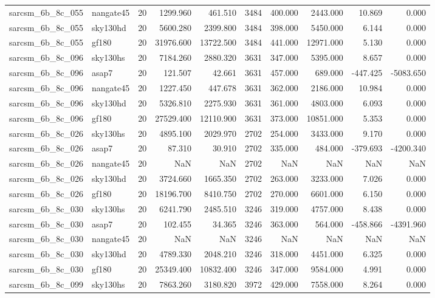 \begin{tabular}{llrrrrrrrr}
sarcsm\_6b\_8c\_055 & nangate45 & 20 & 1299.960 & 461.510 & 3484 & 400.000 & 2443.000 & 10.869 & 0.000 \\
sarcsm\_6b\_8c\_055 & sky130hd & 20 & 5600.280 & 2399.800 & 3484 & 398.000 & 5450.000 & 6.144 & 0.000 \\
sarcsm\_6b\_8c\_055 & gf180 & 20 & 31976.600 & 13722.500 & 3484 & 441.000 & 12971.000 & 5.130 & 0.000 \\
sarcsm\_6b\_8c\_096 & sky130hs & 20 & 7184.260 & 2880.320 & 3631 & 347.000 & 5395.000 & 8.657 & 0.000 \\
sarcsm\_6b\_8c\_096 & asap7 & 20 & 121.507 & 42.661 & 3631 & 457.000 & 689.000 & -447.425 & -5083.650 \\
sarcsm\_6b\_8c\_096 & nangate45 & 20 & 1227.450 & 447.678 & 3631 & 362.000 & 2186.000 & 10.984 & 0.000 \\
sarcsm\_6b\_8c\_096 & sky130hd & 20 & 5326.810 & 2275.930 & 3631 & 361.000 & 4803.000 & 6.093 & 0.000 \\
sarcsm\_6b\_8c\_096 & gf180 & 20 & 27529.400 & 12110.900 & 3631 & 373.000 & 10851.000 & 5.353 & 0.000 \\
sarcsm\_6b\_8c\_026 & sky130hs & 20 & 4895.100 & 2029.970 & 2702 & 254.000 & 3433.000 & 9.170 & 0.000 \\
sarcsm\_6b\_8c\_026 & asap7 & 20 & 87.310 & 30.910 & 2702 & 335.000 & 484.000 & -379.693 & -4200.340 \\
sarcsm\_6b\_8c\_026 & nangate45 & 20 & NaN & NaN & 2702 & NaN & NaN & NaN & NaN \\
sarcsm\_6b\_8c\_026 & sky130hd & 20 & 3724.660 & 1665.350 & 2702 & 263.000 & 3233.000 & 7.026 & 0.000 \\
sarcsm\_6b\_8c\_026 & gf180 & 20 & 18196.700 & 8410.750 & 2702 & 270.000 & 6601.000 & 6.150 & 0.000 \\
sarcsm\_6b\_8c\_030 & sky130hs & 20 & 6241.790 & 2485.510 & 3246 & 319.000 & 4757.000 & 8.438 & 0.000 \\
sarcsm\_6b\_8c\_030 & asap7 & 20 & 102.455 & 34.365 & 3246 & 363.000 & 564.000 & -458.866 & -4391.960 \\
sarcsm\_6b\_8c\_030 & nangate45 & 20 & NaN & NaN & 3246 & NaN & NaN & NaN & NaN \\
sarcsm\_6b\_8c\_030 & sky130hd & 20 & 4789.330 & 2048.210 & 3246 & 318.000 & 4451.000 & 6.325 & 0.000 \\
sarcsm\_6b\_8c\_030 & gf180 & 20 & 25349.400 & 10832.400 & 3246 & 347.000 & 9584.000 & 4.991 & 0.000 \\
sarcsm\_6b\_8c\_099 & sky130hs & 20 & 7863.260 & 3180.820 & 3972 & 429.000 & 7558.000 & 8.264 & 0.000 \\

\end{tabular}
